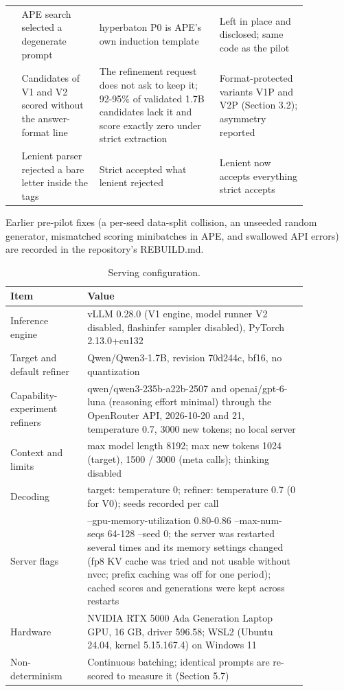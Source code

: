 \documentclass{ieeeaccess}
\begin{document}
\begin{table}[htbp]
\begin{tabular}{>{\raggedright\arraybackslash}p{0.034\linewidth}>{\raggedright\arraybackslash}p{0.224\linewidth}>{\raggedright\arraybackslash}p{0.344\linewidth}>{\raggedright\arraybackslash}p{0.258\linewidth}}
11 & APE search selected a degenerate prompt & hyperbaton P0 is APE's own induction template & Left in place and disclosed; same code as the pilot \\
12 & Candidates of V1 and V2 scored without the answer-format line & The refinement request does not ask to keep it; 92-95\% of validated 1.7B candidates lack it and score exactly zero under strict extraction & Format-protected variants V1P and V2P (Section 3.2); asymmetry reported \\
13 & Lenient parser rejected a bare letter inside the tags & Strict accepted what lenient rejected & Lenient now accepts everything strict accepts \\
\bottomrule
\end{tabular}
\end{table}

Earlier pre-pilot fixes (a per-seed data-split collision, an unseeded random generator, mismatched scoring minibatches in APE, and swallowed API errors) are recorded in the repository's REBUILD.md.

\begin{table}[htbp]
\centering
\small
\caption{Serving configuration.}
\begin{tabular}{>{\raggedright\arraybackslash}p{0.224\linewidth}>{\raggedright\arraybackslash}p{0.636\linewidth}}
\toprule
\textbf{Item} & \textbf{Value} \\
\midrule
Inference engine & vLLM 0.28.0 (V1 engine, model runner V2 disabled, flashinfer sampler disabled), PyTorch 2.13.0+cu132 \\
Target and default refiner & Qwen/Qwen3-1.7B, revision 70d244c, bf16, no quantization \\
Capability-experiment refiners & qwen/qwen3-235b-a22b-2507 and openai/gpt-6-luna (reasoning effort minimal) through the OpenRouter API, 2026-10-20 and 21, temperature 0.7, 3000 new tokens; no local server \\
Context and limits & max model length 8192; max new tokens 1024 (target), 1500 / 3000 (meta calls); thinking disabled \\
Decoding & target: temperature 0; refiner: temperature 0.7 (0 for V0); seeds recorded per call \\
Server flags & --gpu-memory-utilization 0.80-0.86 --max-num-seqs 64-128 --seed 0; the server was restarted several times and its memory settings changed (fp8 KV cache was tried and not usable without nvcc; prefix caching was off for one period); cached scores and generations were kept across restarts \\
Hardware & NVIDIA RTX 5000 Ada Generation Laptop GPU, 16 GB, driver 596.58; WSL2 (Ubuntu 24.04, kernel 5.15.167.4) on Windows 11 \\
Non-determinism & Continuous batching; identical prompts are re-scored to measure it (Section 5.7) \\
\bottomrule
\end{tabular}
\end{table}
\end{document}
